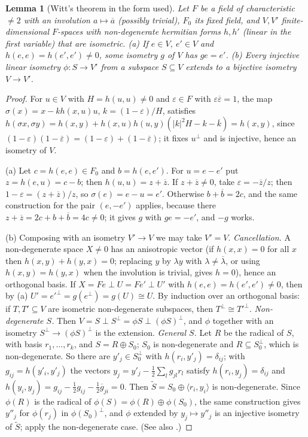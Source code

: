\documentclass[10pt]{amsart}
\newtheorem{lemma}[theorem]{Lemma}
\theoremstyle{definition}
\theoremstyle{remark}
\providecommand{\aubar}[1]{\overline{#1}}
\begin{document}
\begin{lemma}[Witt's theorem in the form used]\label{pbp:tb-witt}
Let $F$ be a field of characteristic $\ne2$ with an involution $a\mapsto\aubar a$ \textup(possibly
trivial\textup), $F_0$ its fixed field, and $V,V'$ finite-dimensional $F$-spaces with non-degenerate
hermitian forms $h,h'$ \textup(linear in the first variable\textup) that are isometric.
\textup{(a)} If $e\in V$, $e'\in V$ and $h(e,e)=h(e',e')\ne0$, some isometry $g$ of $V$ has $ge=e'$.
\textup{(b)} Every injective linear isometry $\phi\colon S\to V'$ from a subspace $S\subseteq V$ extends to
a bijective isometry $V\to V'$.
\end{lemma}
\begin{proof}
For $u\in V$ with $H=h(u,u)\ne0$ and $\varepsilon\in F$ with $\varepsilon\aubar\varepsilon=1$, the map
$\sigma(x)=x-kh(x,u)u$, $k=(1-\varepsilon)/H$, satisfies $h(\sigma x,\sigma y)=h(x,y)+h(x,u)h(u,y)
(|k|^2H-k-\aubar k)=h(x,y)$, since $(1-\varepsilon)(1-\aubar\varepsilon)=(1-\varepsilon)+(1-\aubar
\varepsilon)$; it fixes $u^\perp$ and is injective, hence an isometry of $V$.

(a) Let $c=h(e,e)\in F_0$ and $b=h(e,e')$. For $u=e-e'$ put $z=h(e,u)=c-b$; then $h(u,u)=z+\aubar z$.
If $z+\aubar z\ne0$, take $\varepsilon=-\aubar z/z$; then $1-\varepsilon=(z+\aubar z)/z$, so
$\sigma(e)=e-u=e'$. Otherwise $b+\aubar b=2c$, and the same construction for the pair $(e,-e')$ applies,
because there $z+\aubar z=2c+b+\aubar b=4c\ne0$; it gives $g$ with $ge=-e'$, and $-g$ works.

(b) Composing with an isometry $V'\to V$ we may take $V'=V$. \emph{Cancellation.} A non-degenerate
space $X\ne0$ has an anisotropic vector (if $h(x,x)=0$ for all $x$ then $h(x,y)+h(y,x)=0$; replacing $y$
by $\lambda y$ with $\lambda\ne\aubar\lambda$, or using $h(x,y)=h(y,x)$ when the involution is trivial,
gives $h=0$), hence an orthogonal basis. If $X=Fe\perp U=Fe'\perp U'$ with $h(e,e)=h(e',e')\ne0$, then by
(a) $U'=e'^\perp=g(e^\perp)=g(U)\cong U$. By induction over an orthogonal basis: if $T,T'\subseteq V$ are
isometric non-degenerate subspaces, then $T^\perp\cong T'^\perp$. \emph{Non-degenerate $S$.} Then
$V=S\perp S^\perp=\phi S\perp(\phi S)^\perp$, and $\phi$ together with an isometry $S^\perp\to(\phi
S)^\perp$ is the extension. \emph{General $S$.} Let $R$ be the radical of $S$, with basis $r_1,\dots,
r_k$, and $S=R\oplus S_0$; $S_0$ is non-degenerate and $R\subseteq S_0^\perp$, which is non-degenerate.
So there are $y'_j\in S_0^\perp$ with $h(r_i,y'_j)=\delta_{ij}$; with $g_{ij}=h(y'_i,y'_j)$ the vectors
$y_j=y'_j-\tfrac12\sum_lg_{jl}r_l$ satisfy $h(r_i,y_j)=\delta_{ij}$ and $h(y_i,y_j)=g_{ij}-\tfrac12
g_{ij}-\tfrac12\aubar g_{ji}=0$. Then $\tilde S=S_0\oplus\langle r_i,y_i\rangle$ is non-degenerate.
Since $\phi(R)$ is the radical of $\phi(S)=\phi(R)\oplus\phi(S_0)$, the same construction gives $y''_j$
for $\phi(r_j)$ in $\phi(S_0)^\perp$, and $\phi$ extended by $y_j\mapsto y''_j$ is an injective isometry
of $\tilde S$; apply the non-degenerate case. (See also \cite[Chapter~7, Theorem~9.1]{Scharlau}.)
\end{proof}
\end{document}
